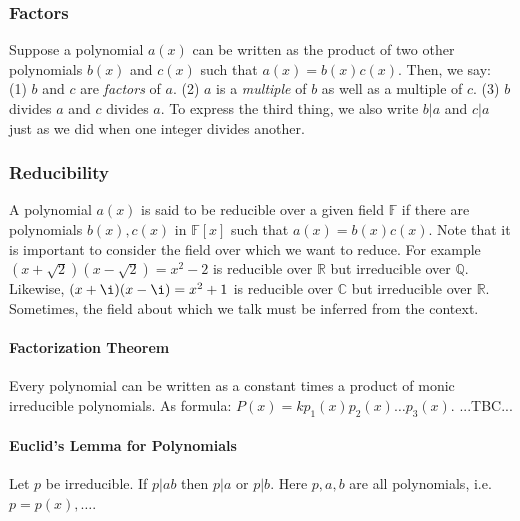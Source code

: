 


\subsubsection{Factors} 
Suppose a polynomial $a(x)$ can be written as the product of two other polynomials $b(x)$ and $c(x)$ such that $a(x) = b(x) c(x)$. Then, we say: (1) $b$ and $c$ are \emph{factors} of $a$. (2) $a$ is a \emph{multiple} of $b$ as well as a multiple of $c$. (3) $b$ divides $a$ and $c$ divides $a$. To express the third thing, we also write $b|a$ and $c|a$ just as we did when one integer divides another.

\subsubsection{Reducibility}
A polynomial $a(x)$ is said to be reducible over a given field $\mathbb{F}$ if there are polynomials $b(x), c(x)$ in $\mathbb{F}[x]$ such that $a(x) = b(x) c(x)$. Note that it is important to consider the field over which we want to reduce. For example $(x+\sqrt{2})(x-\sqrt{2}) = x^2 - 2$ is reducible over $\mathbb{R}$ but irreducible over $\mathbb{Q}$. Likewise, $(x+\i)(x-\i) = x^2 + 1$ is reducible over $\mathbb{C}$ but irreducible over $\mathbb{R}$. Sometimes, the field about which we talk must be inferred from the context.


\paragraph{Factorization Theorem}
Every polynomial can be written as a constant times a product of monic irreducible polynomials. As formula: $P(x) = k p_1(x) p_2(x) \ldots p_3(x)$.  ...TBC...

\paragraph{Euclid's Lemma for Polynomials}
Let $p$ be irreducible. If $p|ab$ then $p|a$ or $p|b$. Here $p,a,b$ are all polynomials, i.e. $p = p(x), \ldots$.


